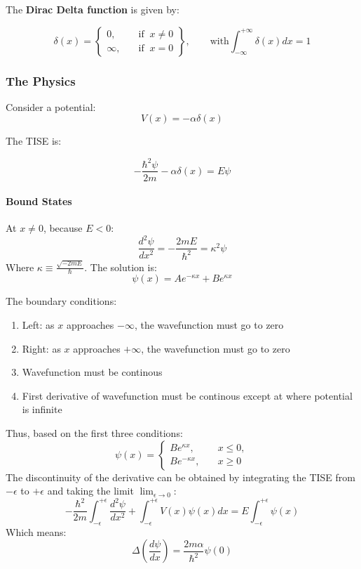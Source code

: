 \documentclass[12pt]{article}
\begin{document}
The \textbf{Dirac Delta function} is given by:

\[
\delta(x) = 
\left.
\begin{cases}
0, \quad &\text{if} \;\; x \neq 0\\
\infty, \quad &\text{if}\;\; x = 0
\end{cases}
\right\}, \qquad \text{with} \int^{+\infty}_{-\infty} \delta(x) dx = 1
\]

\subsubsection{The Physics}
Consider a potential:
\[V(x) = -\alpha \delta(x)\]

The TISE is:

\[-\frac{\hbar^2\psi}{2m} -\alpha \delta(x) = E\psi\]

\paragraph{Bound States}
At $x \neq 0$, because $E< 0$:
\[\frac{d^2\psi}{dx^2}=-\frac{2mE}{\hbar^2}=\kappa^2\psi\]
Where $\kappa \equiv \frac{\sqrt{-2mE}}{\hbar}$.
The solution is:
\[ \psi(x) = Ae^{-\kappa x} + Be^{\kappa x}\]

The boundary conditions:
\begin{enumerate}
    \item Left: as $x$ approaches $-\infty$, the wavefunction must go to zero
    \item Right: as $x$ approaches $+\infty$, the wavefunction must go to zero
    \item Wavefunction must be continous
    \item First derivative of wavefunction must be continous except at where potential is infinite
\end{enumerate}

Thus, based on the first three conditions:
\[ 
\psi(x) = \left.
\begin{cases}
Be^{\kappa x}, \quad & x \leq 0,\\
Be^{-\kappa x}, \quad & x \geq 0
\end{cases}
\right.
\]
The discontinuity of the derivative can be obtained by integrating the TISE from $-\epsilon$ to $+\epsilon$ and taking the limit \(\lim_{\epsilon\to0}\):
\[-\frac{\hbar^2}{2m}\int^{+\epsilon}_{-\epsilon}\frac{d^2\psi}{dx^2}+\int^{+\epsilon}_{-\epsilon}V(x)\psi(x)dx = E\int^{+\epsilon}_{-\epsilon}\psi(x)\]
Which means:
\[\Delta(\frac{d\psi}{dx}) = \frac{2m\alpha}{\hbar^2}\psi(0)\]
\end{document}
